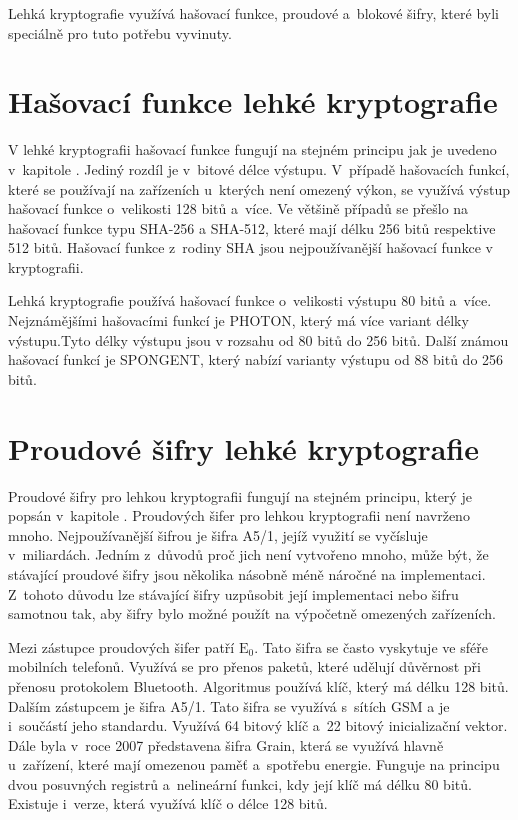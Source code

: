 Lehká kryptografie využívá hašovací funkce, proudové a~blokové šifry, které byli speciálně pro tuto potřebu vyvinuty.\cite{Klima}


\section{Hašovací funkce lehké kryptografie}
V lehké kryptografii hašovací funkce fungují na stejném principu jak je uvedeno v~kapitole . Jediný rozdíl je v~bitové délce výstupu. V~případě hašovacích funkcí, které se používají na zařízeních u~kterých není omezený výkon, se využívá výstup hašovací funkce o~velikosti 128 bitů a~více. Ve většině případů se přešlo na hašovací funkce typu SHA-256 a SHA-512, které mají délku 256 bitů respektive 512 bitů. Hašovací funkce z~rodiny SHA jsou nejpoužívanější hašovací funkce v kryptografii. 

Lehká kryptografie používá hašovací funkce o~velikosti výstupu 80 bitů a~více. Nejznámějšími hašovacími funkcí je PHOTON, který má více variant délky výstupu.Tyto délky výstupu jsou v rozsahu od 80 bitů do 256 bitů. Další známou hašovací funkcí je SPONGENT, který nabízí varianty výstupu od 88 bitů do 256 bitů.\cite{LightHash}

\section{Proudové šifry lehké kryptografie}
Proudové šifry pro lehkou kryptografii fungují na stejném principu, který je popsán v~kapitole . Proudových šifer pro lehkou kryptografii není navrženo mnoho. Nejpoužívanější šifrou je šifra A5/1, jejíž využití se vyčísluje v~miliardách. Jedním z~důvodů proč jich není vytvořeno mnoho, může být, že stávající proudové šifry jsou několika násobně méně náročné na implementaci. Z~tohoto důvodu lze stávající šifry uzpůsobit její implementaci nebo šifru samotnou tak, aby šifry bylo možné použít na výpočetně omezených zařízeních.\cite{SaldaBP}

Mezi zástupce proudových šifer patří $\mathrm{E_0}$. Tato šifra se často vyskytuje ve sféře mobilních telefonů. Využívá se pro přenos paketů, které udělují důvěrnost při přenosu protokolem Bluetooth. Algoritmus používá klíč, který má délku 128 bitů. Dalším zástupcem je šifra A5/1. Tato šifra se využívá s~sítích GSM a je i~součástí jeho standardu. Využívá 64 bitový klíč a~22 bitový inicializační vektor. Dále byla v~roce 2007 představena šifra Grain, která se využívá hlavně u~zařízení, které mají omezenou paměť a~spotřebu energie. Funguje na principu dvou posuvných registrů a~nelineární funkci, kdy její klíč má délku 80 bitů. Existuje i~verze, která využívá klíč o délce 128 bitů.\cite{SaldaBP} %

